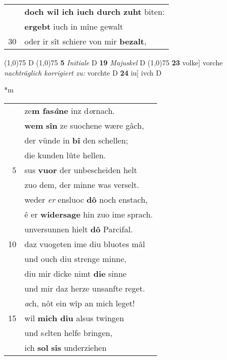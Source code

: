 \documentclass[8pt,a4paper,notitlepage]{article}
\begin{document}
\begin{table}[ht]
\begin{minipage}[t]{0.5\linewidth}
\begin{tabular}{rl}
 & \textbf{doch wil ich iuch durch zuht} biten:\\ 
 & \textbf{ergebt} iuch in mîne gewalt\\ 
30 & oder ir sît schiere von mir \textbf{bezalt},\\ 
\end{tabular}
\scriptsize
\line(1,0){75} \newline
D \newline
\line(1,0){75} \newline
\textbf{5} \textit{Initiale} D  \textbf{19} \textit{Majuskel} D  \newline
\line(1,0){75} \newline
\textbf{23} volke] vorche \textit{nachträglich korrigiert zu:} vorchte D \textbf{24} iu] ivch D \newline
\end{minipage}
\hspace{0.5cm}
\begin{minipage}[t]{0.5\linewidth}
\small
\begin{center}*m
\end{center}
\begin{tabular}{rl}
 & ze\textbf{m fas\textit{â}ne} inz d\textit{o}rnach.\\ 
 & \textbf{wem} \textbf{sîn} ze suochene wære gâch,\\ 
 & der vünde in \textbf{bî} den schellen;\\ 
 & die kunden lûte hellen.\\ 
5 & sus \textbf{vuor} der unbescheiden helt\\ 
 & zuo dem, der minne was verselt.\\ 
 & weder \textit{er} ensluoc \textbf{dô} noch enstach,\\ 
 & ê er \textbf{widersage} hin zuo ime sprach.\\ 
 & unversunnen hielt \textbf{dô} Parcifal.\\ 
10 & daz vuogeten ime diu bluotes mâl\\ 
 & und ouch diu strenge minne,\\ 
 & diu mir dicke nimt \textbf{die} sinne\\ 
 & und mir daz herze unsanfte reget.\\ 
 & \textit{a}ch, nôt ein wîp an mich leget!\\ 
15 & wil \textbf{mich diu} alsus twingen\\ 
 & und s\textit{e}lten helfe bringen,\\ 
 & ich \textbf{sol} \textbf{sis} underziehen\\ 

\end{tabular}
\end{minipage}
\end{table}
\end{document}
